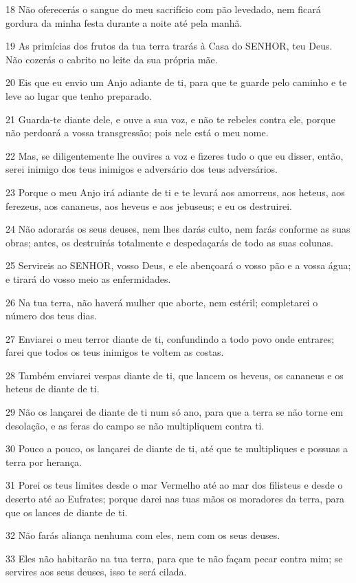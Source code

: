 \par 18 Não oferecerás o sangue do meu sacrifício com pão levedado, nem ficará gordura da minha festa durante a noite até pela manhã.
\par 19 As primícias dos frutos da tua terra trarás à Casa do SENHOR, teu Deus. Não cozerás o cabrito no leite da sua própria mãe.
\par 20 Eis que eu envio um Anjo adiante de ti, para que te guarde pelo caminho e te leve ao lugar que tenho preparado.
\par 21 Guarda-te diante dele, e ouve a sua voz, e não te rebeles contra ele, porque não perdoará a vossa transgressão; pois nele está o meu nome.
\par 22 Mas, se diligentemente lhe ouvires a voz e fizeres tudo o que eu disser, então, serei inimigo dos teus inimigos e adversário dos teus adversários.
\par 23 Porque o meu Anjo irá adiante de ti e te levará aos amorreus, aos heteus, aos ferezeus, aos cananeus, aos heveus e aos jebuseus; e eu os destruirei.
\par 24 Não adorarás os seus deuses, nem lhes darás culto, nem farás conforme as suas obras; antes, os destruirás totalmente e despedaçarás de todo as suas colunas.
\par 25 Servireis ao SENHOR, vosso Deus, e ele abençoará o vosso pão e a vossa água; e tirará do vosso meio as enfermidades.
\par 26 Na tua terra, não haverá mulher que aborte, nem estéril; completarei o número dos teus dias.
\par 27 Enviarei o meu terror diante de ti, confundindo a todo povo onde entrares; farei que todos os teus inimigos te voltem as costas.
\par 28 Também enviarei vespas diante de ti, que lancem os heveus, os cananeus e os heteus de diante de ti.
\par 29 Não os lançarei de diante de ti num só ano, para que a terra se não torne em desolação, e as feras do campo se não multipliquem contra ti.
\par 30 Pouco a pouco, os lançarei de diante de ti, até que te multipliques e possuas a terra por herança.
\par 31 Porei os teus limites desde o mar Vermelho até ao mar dos filisteus e desde o deserto até ao Eufrates; porque darei nas tuas mãos os moradores da terra, para que os lances de diante de ti.
\par 32 Não farás aliança nenhuma com eles, nem com os seus deuses.
\par 33 Eles não habitarão na tua terra, para que te não façam pecar contra mim; se servires aos seus deuses, isso te será cilada.

